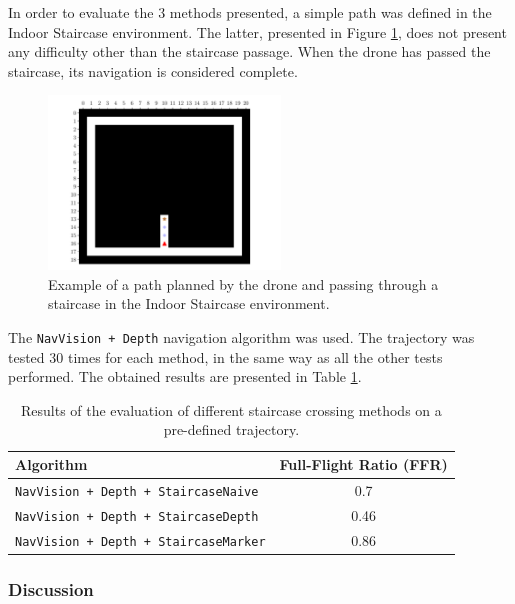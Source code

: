 In order to evaluate the $3$ methods presented, a simple path was defined in the Indoor Staircase environment. The latter, presented in Figure \ref{fig:06.advanced.staircase.path}, does not present any difficulty other than the staircase passage. When the drone has passed the staircase, its navigation is considered complete.

\begin{figure}[H]
    \centering
    \includegraphics[width=0.55\textwidth]{resources/pdf/06/staircase/path.pdf}
    \caption{Example of a path planned by the drone and passing through a staircase in the Indoor Staircase environment.}
    \label{fig:06.advanced.staircase.path}
\end{figure}

The \texttt{NavVision + Depth} navigation algorithm was used. The trajectory was tested $\num{30}$ times for each method, in the same way as all the other tests performed. The obtained results are presented in Table \ref{tab:06.evaluation.staircase.results}.

\begin{table}[H]
    \centering
    \begin{tabular}{|l|c|}
        \hline
        \textbf{Algorithm} & \textbf{Full-Flight Ratio} (FFR) \\ \hline
        \hline
        \texttt{NavVision + Depth + StaircaseNaive} & \num{0.7} \\ \hline
        \texttt{NavVision + Depth + StaircaseDepth} & \num{0.46} \\ \hline
        \texttt{NavVision + Depth + StaircaseMarker} & \num{0.86} \\ \hline
    \end{tabular}
    \caption{Results of the evaluation of different staircase crossing methods on a pre-defined trajectory.}
    \label{tab:06.evaluation.staircase.results}
\end{table}

\subsubsection{Discussion}

